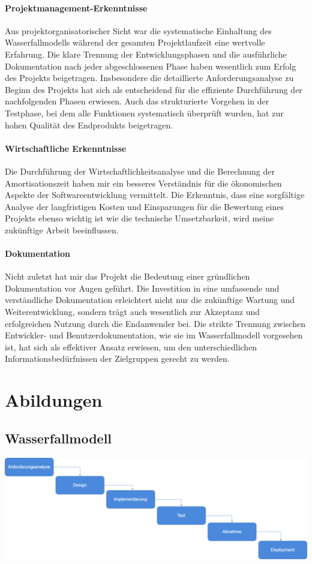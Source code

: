 \documentclass[a4paper,11pt]{article}
\begin{document}
\paragraph{Projektmanagement-Erkenntnisse}
Aus projektorganisatorischer Sicht war die systematische Einhaltung des Wasserfallmodells während der gesamten Projektlaufzeit eine wertvolle Erfahrung. Die klare Trennung der Entwicklungsphasen und die ausführliche Dokumentation nach jeder abgeschlossenen Phase haben wesentlich zum Erfolg des Projekts beigetragen. Insbesondere die detaillierte Anforderungsanalyse zu Beginn des Projekts hat sich als entscheidend für die effiziente Durchführung der nachfolgenden Phasen erwiesen. Auch das strukturierte Vorgehen in der Testphase, bei dem alle Funktionen systematisch überprüft wurden, hat zur hohen Qualität des Endprodukts beigetragen.

\paragraph{Wirtschaftliche Erkenntnisse}
Die Durchführung der Wirtschaftlichkeitsanalyse und die Berechnung der Amortisationszeit haben mir ein besseres Verständnis für die ökonomischen Aspekte der Softwareentwicklung vermittelt. Die Erkenntnis, dass eine sorgfältige Analyse der langfristigen Kosten und Einsparungen für die Bewertung eines Projekts ebenso wichtig ist wie die technische Umsetzbarkeit, wird meine zukünftige Arbeit beeinflussen.

\paragraph{Dokumentation}
Nicht zuletzt hat mir das Projekt die Bedeutung einer gründlichen Dokumentation vor Augen geführt. Die Investition in eine umfassende und verständliche Dokumentation erleichtert nicht nur die zukünftige Wartung und Weiterentwicklung, sondern trägt auch wesentlich zur Akzeptanz und erfolgreichen Nutzung durch die Endanwender bei. Die strikte Trennung zwischen Entwickler- und Benutzerdokumentation, wie sie im Wasserfallmodell vorgesehen ist, hat sich als effektiver Ansatz erwiesen, um den unterschiedlichen Informationsbedürfnissen der Zielgruppen gerecht zu werden.


\newpage
\section{Abildungen}
\subsection{Wasserfallmodell}
\includegraphics[width=1.1\textwidth]{waterfall.drawio}
\end{document}
